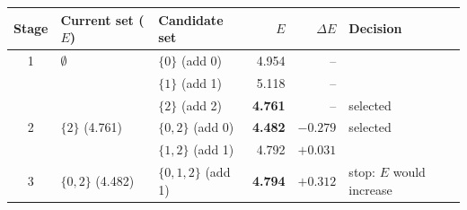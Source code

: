 \begin{tabular}{cllrrl}
\toprule
Stage & Current set ($E$) & Candidate set & $E$ & $\Delta E$ & Decision \\
\midrule
1 & $\emptyset$ & $\{0\}$ (add 0) & 4.954 & -- &  \\
& & $\{1\}$ (add 1) & 5.118 & -- &  \\
& & $\{2\}$ (add 2) & \textbf{4.761} & -- & selected \\
\midrule
2 & $\{2\}$ (4.761) & $\{0,2\}$ (add 0) & \textbf{4.482} & $-0.279$ & selected \\
& & $\{1,2\}$ (add 1) & 4.792 & $+0.031$ &  \\
\midrule
3 & $\{0,2\}$ (4.482) & $\{0,1,2\}$ (add 1) & \textbf{4.794} & $+0.312$ & stop: $E$ would increase \\
\bottomrule
\end{tabular}
